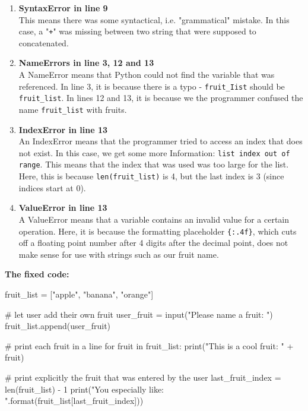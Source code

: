 \begin{solution}
    \begin{enumerate}
        \item \textbf{SyntaxError in line 9} \\
              This means there was some syntactical, i.e. "grammatical" mistake. In this case, a "\texttt{+}" was missing between two string that were supposed to concatenated.
        \item \textbf{NameErrors in line 3, 12 and 13} \\
              A NameError means that Python could not find the variable that was referenced. In line 3, it is because there is a typo - \texttt{fruit\_Iist} should be \texttt{fruit\_list}. In lines 12 and 13, it is because we the programmer confused the name \texttt{fruit\_list} with fruits.
        \item \textbf{IndexError in line 13} \\
              An IndexError means that the programmer tried to access an index that does not exist. In this case, we get some more Information: \texttt{list index out of range}. This means that the index that was used was too large for the list. Here, this is because \texttt{len(fruit\_list)} is 4, but the last index is 3 (since indices start at 0).
        \item \textbf{ValueError in line 13} \\
              A ValueError means that a variable contains an invalid value for a certain operation. Here, it is because the formatting placeholder \texttt{\{:.4f\}}, which cuts off a floating point number after 4 digits after the decimal point, does not make sense for use with strings such as our fruit name.
    \end{enumerate}

\noindent \textbf{The fixed code:}

    \begin{pythoncode}
fruit_list = ["apple", "banana", "orange"]

# let user add their own fruit
user_fruit = input("Please name a fruit: ")
fruit_list.append(user_fruit)

# print each fruit in a line
for fruit in fruit_list:
    print("This is a cool fruit: " + fruit)

# print explicitly the fruit that was entered by the user
last_fruit_index = len(fruit_list) - 1
print("You especially like: {}".format(fruit_list[last_fruit_index]))
    \end{pythoncode}
\end{solution}

